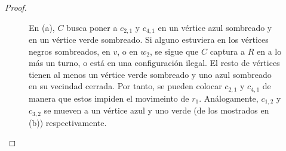 \begin{proof}
\begin{enumerate}
        \begin{figure}[H]
            \begin{tcbitemize}[raster columns=2, raster equal height, enhanced,
                colback=Black!5!white,colframe=Grey!75!black, attach title to upper,
                phantom={\setcounter{myrasternum}{\thetcbrasternum}},
                title={(\alph{myrasternum})\enspace}, halign lower=center, halign
                upper = left, lower separated=false, middle=0mm, boxsep=0mm,
                leftupper=2mm, left=2mm, right=2mm, fonttitle=\bfseries,
                coltitle=black, raster column skip=1mm,raster halign=center, raster
                row skip=1mm]
                \tcbitem
                    \tcblower
                
                \tcbitem
                    \tcblower
            \end{tcbitemize}
            \captionsetup{font=footnotesize}
            \caption{En (a), $C$ busca poner a $c_{2,1}$ y $c_{4,1}$ en un
            v\'ertice azul sombreado y en un v\'ertice verde sombreado. Si
            alguno estuviera en los v\'ertices negros sombreados, en $v$, o en
            $w_2$, se sigue que $C$ captura a $R$ en a lo m\'as un turno, o
            est\'a en una configuraci\'on ilegal. El resto de v\'ertices tienen
            al menos un v\'ertice verde sombreado y uno azul sombreado en su
            vecindad cerrada. Por tanto, se pueden colocar $c_{2,1}$ y $c_{4,1}$
            de manera que estos impiden el movimeinto de $r_1$. An\'alogamente,
            $c_{1,2}$ y $c_{3,2}$ se mueven a un v\'ertice azul y uno verde (de
            los mostrados en (b)) respectivamente.}
            \label{fig:guarding7}
        \end{figure}


\end{enumerate}
\end{proof}
